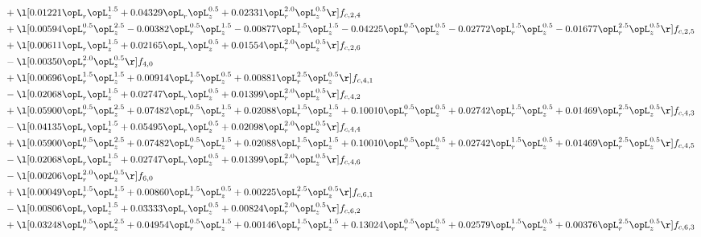 \begin{alignat}{2}
& + \l[  0.01221 \opL_r \opL_z^{1.5} +  0.04329 \opL_r \opL_z^{0.5} +  0.02331 \opL_r^{2.0} \opL_z^{0.5}  \r] f_{c,2,4} \nonumber \\ 
& + \l[  0.00594 \opL_r^{0.5} \opL_z^{2.5}   -0.00382 \opL_r^{0.5} \opL_z^{1.5}   -0.00877 \opL_r^{1.5} \opL_z^{1.5}   -0.04225 \opL_r^{0.5} \opL_z^{0.5}   -0.02772 \opL_r^{1.5} \opL_z^{0.5}   -0.01677 \opL_r^{2.5} \opL_z^{0.5}  \r] f_{c,2,5} \nonumber \\ 
& + \l[  0.00611 \opL_r \opL_z^{1.5} +  0.02165 \opL_r \opL_z^{0.5} +  0.01554 \opL_r^{2.0} \opL_z^{0.5}  \r] f_{c,2,6} \nonumber \\ 
& - \l[  0.00350 \opL_r^{2.0} \opL_z^{0.5}  \r] f_{4,0} \nonumber \\ 
& + \l[  0.00696 \opL_r^{1.5} \opL_z^{1.5} +  0.00914 \opL_r^{1.5} \opL_z^{0.5} +  0.00881 \opL_r^{2.5} \opL_z^{0.5}  \r] f_{c,4,1} \nonumber \\ 
& - \l[  0.02068 \opL_r \opL_z^{1.5} +  0.02747 \opL_r \opL_z^{0.5} +  0.01399 \opL_r^{2.0} \opL_z^{0.5}  \r] f_{c,4,2} \nonumber \\ 
& + \l[  0.05900 \opL_r^{0.5} \opL_z^{2.5} +  0.07482 \opL_r^{0.5} \opL_z^{1.5} +  0.02088 \opL_r^{1.5} \opL_z^{1.5} +  0.10010 \opL_r^{0.5} \opL_z^{0.5} +  0.02742 \opL_r^{1.5} \opL_z^{0.5} +  0.01469 \opL_r^{2.5} \opL_z^{0.5}  \r] f_{c,4,3} \nonumber \\ 
& - \l[  0.04135 \opL_r \opL_z^{1.5} +  0.05495 \opL_r \opL_z^{0.5} +  0.02098 \opL_r^{2.0} \opL_z^{0.5}  \r] f_{c,4,4} \nonumber \\ 
& + \l[  0.05900 \opL_r^{0.5} \opL_z^{2.5} +  0.07482 \opL_r^{0.5} \opL_z^{1.5} +  0.02088 \opL_r^{1.5} \opL_z^{1.5} +  0.10010 \opL_r^{0.5} \opL_z^{0.5} +  0.02742 \opL_r^{1.5} \opL_z^{0.5} +  0.01469 \opL_r^{2.5} \opL_z^{0.5}  \r] f_{c,4,5} \nonumber \\ 
& - \l[  0.02068 \opL_r \opL_z^{1.5} +  0.02747 \opL_r \opL_z^{0.5} +  0.01399 \opL_r^{2.0} \opL_z^{0.5}  \r] f_{c,4,6} \nonumber \\ 
& - \l[  0.00206 \opL_r^{2.0} \opL_z^{0.5}  \r] f_{6,0} \nonumber \\ 
& + \l[  0.00049 \opL_r^{1.5} \opL_z^{1.5} +  0.00860 \opL_r^{1.5} \opL_z^{0.5} +  0.00225 \opL_r^{2.5} \opL_z^{0.5}  \r] f_{c,6,1} \nonumber \\ 
& - \l[  0.00806 \opL_r \opL_z^{1.5} +  0.03333 \opL_r \opL_z^{0.5} +  0.00824 \opL_r^{2.0} \opL_z^{0.5}  \r] f_{c,6,2} \nonumber \\ 
& + \l[  0.03248 \opL_r^{0.5} \opL_z^{2.5} +  0.04954 \opL_r^{0.5} \opL_z^{1.5} +  0.00146 \opL_r^{1.5} \opL_z^{1.5} +  0.13024 \opL_r^{0.5} \opL_z^{0.5} +  0.02579 \opL_r^{1.5} \opL_z^{0.5} +  0.00376 \opL_r^{2.5} \opL_z^{0.5}  \r] f_{c,6,3} \nonumber \\ 

\end{alignat}
